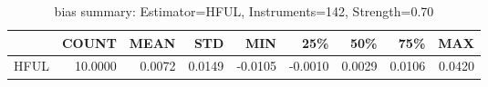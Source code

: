 \begin{table}[ht]
\centering
\caption{bias summary: Estimator=HFUL, Instruments=142, Strength=0.70}
\begin{tabular}{lrrrrrrrr}
\toprule
 & COUNT & MEAN & STD & MIN & 25\% & 50\% & 75\% & MAX \\
\midrule
HFUL & 10.0000 & 0.0072 & 0.0149 & -0.0105 & -0.0010 & 0.0029 & 0.0106 & 0.0420 \\
\bottomrule
\end{tabular}
\end{table}
